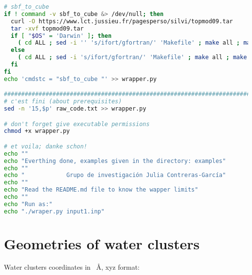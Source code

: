 \begin{lstlisting}[language=bash]
# sbf_to_cube
if ! command -v sbf_to_cube &> /dev/null; then
  curl -O https://www.lct.jussieu.fr/pagesperso/silvi/topmod09.tar
  tar -xvf topmod09.tar
  if [ "$OS" = 'Darwin' ]; then
    ( cd ALL ; sed -i '' 's/ifort/gfortran/' 'Makefile' ; make all ; make install )
  else
    ( cd ALL ; sed -i 's/ifort/gfortran/' 'Makefile' ; make all ; make install )
  fi
fi
echo 'cmdstc = "sbf_to_cube "' >> wrapper.py

########################################################################
# c'est fini (about prerequisites)
sed -n '15,$p' raw_code.txt >> wrapper.py

# don't forget give executable permissions
chmod +x wrapper.py

# et voila; danke schon!
echo ""
echo "Everthing done, examples given in the directory: examples"
echo ""
echo "            Grupo de investigación Julia Contreras-García"
echo ""
echo "Read the README.md file to know the wapper limits"
echo ""
echo "Run as:"
echo "./wraper.py input1.inp"

\end{lstlisting}

\newpage

\section{Geometries of water clusters}

Water clusters coordinates in \SI{}{\angstrom}, xyz format:

